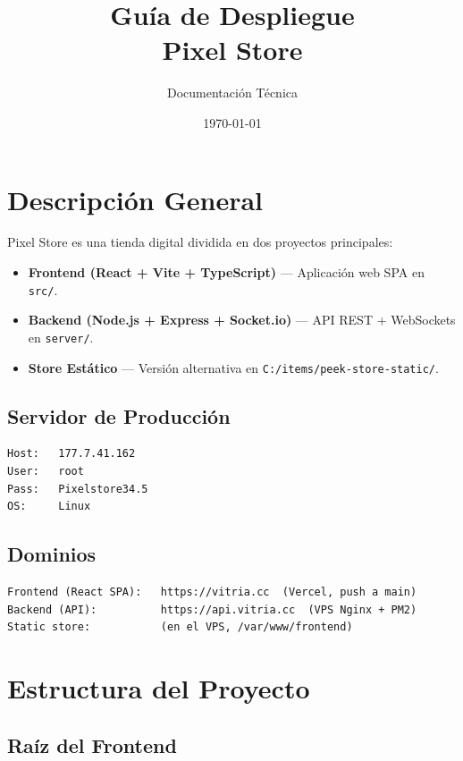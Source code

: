 \documentclass[12pt,a4paper]{article}
\title{\textbf{Guía de Despliegue\\Pixel Store}}
\author{Documentación Técnica}
\date{\today}
\begin{document}
\maketitle
\thispagestyle{empty}
\newpage

\tableofcontents
\newpage

\section{Descripción General}

Pixel Store es una tienda digital dividida en dos proyectos principales:

\begin{itemize}
  \item \textbf{Frontend (React + Vite + TypeScript)} --- Aplicación web SPA en \texttt{src/}.
  \item \textbf{Backend (Node.js + Express + Socket.io)} --- API REST + WebSockets en \texttt{server/}.
  \item \textbf{Store Estático} --- Versión alternativa en \texttt{C:/items/peek-store-static/}.
\end{itemize}

\subsection{Servidor de Producción}

\begin{lstlisting}
Host:   177.7.41.162
User:   root
Pass:   Pixelstore34.5
OS:     Linux
\end{lstlisting}

\subsection{Dominios}

\begin{lstlisting}
Frontend (React SPA):   https://vitria.cc  (Vercel, push a main)
Backend (API):          https://api.vitria.cc  (VPS Nginx + PM2)
Static store:           (en el VPS, /var/www/frontend)
\end{lstlisting}

\newpage

\section{Estructura del Proyecto}

\subsection{Raíz del Frontend}
\end{document}
